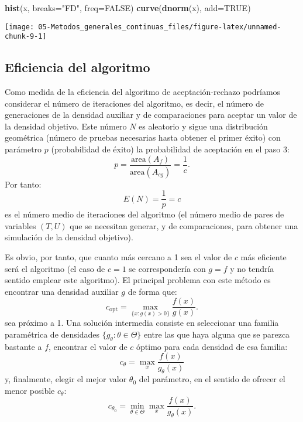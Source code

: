 \documentclass[
]{book}
\newenvironment{Shaded}{\begin{snugshade}}{\end{snugshade}}
\newcommand{\DataTypeTok}[1]{\textcolor[rgb]{0.13,0.29,0.53}{#1}}
\newcommand{\KeywordTok}[1]{\textcolor[rgb]{0.13,0.29,0.53}{\textbf{#1}}}
\newcommand{\NormalTok}[1]{#1}
\newcommand{\OtherTok}[1]{\textcolor[rgb]{0.56,0.35,0.01}{#1}}
\newcommand{\StringTok}[1]{\textcolor[rgb]{0.31,0.60,0.02}{#1}}
\theoremstyle{break}
\theoremstyle{definition}
\theoremstyle{definition}
\theoremstyle{definition}
\theoremstyle{remark}
\begin{document}
\begin{enumerate}
\begin{Shaded}
\begin{Highlighting}[]
\KeywordTok{hist}\NormalTok{(x, }\DataTypeTok{breaks=}\StringTok{"FD"}\NormalTok{, }\DataTypeTok{freq=}\OtherTok{FALSE}\NormalTok{)}
\KeywordTok{curve}\NormalTok{(}\KeywordTok{dnorm}\NormalTok{(x), }\DataTypeTok{add=}\OtherTok{TRUE}\NormalTok{)}
\end{Highlighting}
\end{Shaded}

  \begin{center}\texttt{[image: 05-Metodos\_generales\_continuas\_files/figure-latex/unnamed-chunk-9-1]} \end{center}
\end{enumerate}

\hypertarget{eficiencia-del-algoritmo}{%
\subsection{Eficiencia del algoritmo}\label{eficiencia-del-algoritmo}}

Como medida de la eficiencia del algoritmo de aceptación-rechazo
podríamos considerar el número de iteraciones del algoritmo,
es decir, el número de generaciones de la densidad auxiliar y
de comparaciones para aceptar un valor de la densidad objetivo.
Este número \(N\) es aleatorio y sigue una distribución geométrica
(número de pruebas necesarias hasta obtener el primer éxito)
con parámetro \(p\) (probabilidad de éxito) la probabilidad de aceptación
en el paso 3:
\[p = \frac{\text{area}\left(
        A_{f}\right) }{\text{area}\left( A_{cg}\right) }=\frac{1}{c}.\]
Por tanto:
\[E\left( N \right) = \frac1p = c\]
es el número medio de iteraciones del algoritmo
(el número medio de pares de variables \(\left( T,U\right)\)
que se necesitan generar, y de comparaciones, para obtener
una simulación de la densidad objetivo).

Es obvio, por tanto, que cuanto más cercano a 1 sea el valor de \(c\) más eficiente será el algoritmo (el caso de \(c=1\) se correspondería con \(g=f\) y no tendría sentido emplear este algoritmo).
El principal problema con este método es encontrar una densidad auxiliar \(g\) de forma que:
\[c_{\text{opt}}=\max_{\{x : g\left( x\right) >0\}}
\frac{f\left( x\right) }{g\left( x\right) }.\]
sea próximo a 1.
Una solución intermedia consiste en seleccionar una familia paramétrica de densidades \(\{g_{\theta} : \theta \in \Theta\}\) entre las que haya alguna que se parezca bastante a \(f\),
encontrar el valor de \(c\) óptimo para cada densidad de esa familia:
\[c_{\theta}=\max_{x}\frac{f\left(  x\right)  }{g_{\theta}\left( x\right) }\]
y, finalmente, elegir el mejor valor \(\theta_{0}\) del parámetro, en el sentido de ofrecer el menor posible \(c_{\theta}\):
\[c_{\theta_{0}}=\min_{\theta\in\Theta}\max_{x}\frac{f\left(  x\right) }{g_{\theta}\left(  x\right)  }.\]
\end{document}
